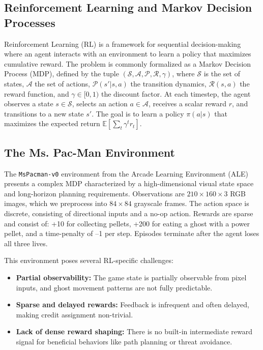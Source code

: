 \documentclass{article}
\begin{document}
\subsection{Reinforcement Learning and Markov Decision Processes}

Reinforcement Learning (RL) is a framework for sequential decision-making where an agent interacts with an environment to learn a policy that maximizes cumulative reward. The problem is commonly formalized as a Markov Decision Process (MDP), defined by the tuple $(\mathcal{S}, \mathcal{A}, \mathcal{P}, \mathcal{R}, \gamma)$, where $\mathcal{S}$ is the set of states, $\mathcal{A}$ the set of actions, $\mathcal{P}(s'|s, a)$ the transition dynamics, $\mathcal{R}(s, a)$ the reward function, and $\gamma \in [0, 1)$ the discount factor. At each timestep, the agent observes a state $s \in \mathcal{S}$, selects an action $a \in \mathcal{A}$, receives a scalar reward $r$, and transitions to a new state $s'$. The goal is to learn a policy $\pi(a|s)$ that maximizes the expected return $\mathbb{E}[\sum_t \gamma^t r_t]$.

\subsection{The Ms. Pac-Man Environment}

The \texttt{MsPacman-v0} environment from the Arcade Learning Environment (ALE) \cite{ale} presents a complex MDP characterized by a high-dimensional visual state space and long-horizon planning requirements. Observations are $210 \times 160 \times 3$ RGB images, which we preprocess into $84 \times 84$ grayscale frames. The action space is discrete, consisting of directional inputs and a no-op action. Rewards are sparse and consist of: +10 for collecting pellets, +200 for eating a ghost with a power pellet, and a time-penalty of –1 per step. Episodes terminate after the agent loses all three lives.

This environment poses several RL-specific challenges:
\begin{itemize}
    \item \textbf{Partial observability:} The game state is partially observable from pixel inputs, and ghost movement patterns are not fully predictable.
    \item \textbf{Sparse and delayed rewards:} Feedback is infrequent and often delayed, making credit assignment non-trivial.
    \item \textbf{Lack of dense reward shaping:} There is no built-in intermediate reward signal for beneficial behaviors like path planning or threat avoidance.
\end{itemize}
\end{document}
